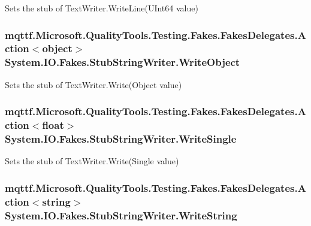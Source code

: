 Sets the stub of Text\-Writer.\-Write\-Line(\-U\-Int64 value)

\hypertarget{class_system_1_1_i_o_1_1_fakes_1_1_stub_string_writer_a27c3393a75f1746571e0f4a415bf44cb}{
\subsubsection[{Write\-Object}]{\setlength{\rightskip}{0pt plus 5cm}mqttf.\-Microsoft.\-Quality\-Tools.\-Testing.\-Fakes.\-Fakes\-Delegates.\-Action$<$object$>$ System.\-I\-O.\-Fakes.\-Stub\-String\-Writer.\-Write\-Object}}\label{class_system_1_1_i_o_1_1_fakes_1_1_stub_string_writer_a27c3393a75f1746571e0f4a415bf44cb}


Sets the stub of Text\-Writer.\-Write(\-Object value)

\hypertarget{class_system_1_1_i_o_1_1_fakes_1_1_stub_string_writer_a0df8ca1893a960d25698711b4f0064f5}{
\subsubsection[{Write\-Single}]{\setlength{\rightskip}{0pt plus 5cm}mqttf.\-Microsoft.\-Quality\-Tools.\-Testing.\-Fakes.\-Fakes\-Delegates.\-Action$<$float$>$ System.\-I\-O.\-Fakes.\-Stub\-String\-Writer.\-Write\-Single}}\label{class_system_1_1_i_o_1_1_fakes_1_1_stub_string_writer_a0df8ca1893a960d25698711b4f0064f5}


Sets the stub of Text\-Writer.\-Write(\-Single value)

\hypertarget{class_system_1_1_i_o_1_1_fakes_1_1_stub_string_writer_ae919b7df2009e920544ff0f8ffb12882}{
\subsubsection[{Write\-String}]{\setlength{\rightskip}{0pt plus 5cm}mqttf.\-Microsoft.\-Quality\-Tools.\-Testing.\-Fakes.\-Fakes\-Delegates.\-Action$<$string$>$ System.\-I\-O.\-Fakes.\-Stub\-String\-Writer.\-Write\-String}}\label{class_system_1_1_i_o_1_1_fakes_1_1_stub_string_writer_ae919b7df2009e920544ff0f8ffb12882}


